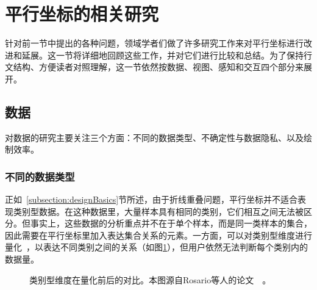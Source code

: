 \documentclass[12pt,twocolumn]{article}
\begin{document}
\section{平行坐标的相关研究}
\label{section:impro}

针对前一节中提出的各种问题，领域学者们做了许多研究工作来对平行坐标进行改进和延展。这一节将详细地回顾这些工作，并对它们进行比较和总结。为了保持行文结构、方便读者对照理解，这一节依然按数据、视图、感知和交互四个部分来展开。

\subsection{数据}
\label{subsection:dataImpro}

对数据的研究主要关注三个方面：不同的数据类型、不确定性与数据隐私、以及绘制效率。

\subsubsection{不同的数据类型}
\label{subsubsection:dataType}

正如~\ref{subsection:designBasics}节所述，由于折线重叠问题，平行坐标并不适合表现类别型数据。在这种数据里，大量样本具有相同的类别，它们相互之间无法被区分。但事实上，这些数据的分析重点并不在于单个样本，而是同一类样本的集合，因此需要在平行坐标里加入表达集合关系的元素。一方面，可以对类别型维度进行量化~\citep{rosario2004mapping}，以表达不同类别之间的关系（如图\ref{fig:PC_Data_Quantification}），但用户依然无法判断每个类别内的数据量。

\begin{figure}[!htb]
\centering
{}
\caption{\label{fig:PC_Data_Quantification}类别型维度在量化前后的对比。本图源自Rosario等人的论文~\citep{rosario2004mapping}~。}
\end{figure}
\end{document}
